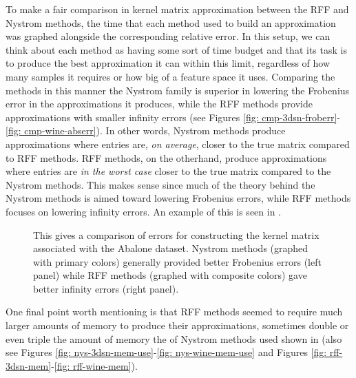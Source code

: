To make a fair comparison in kernel matrix approximation between the RFF and Nystrom methods, the time that each method used to build an approximation was graphed alongside the corresponding relative error. In this setup, we can think about each method as having some sort of time budget and that its task is to produce the best approximation it can within this limit, regardless of how many samples it requires or how big of a feature space it uses. Comparing the methods in this manner the Nystrom family is superior in lowering the Frobenius error in the approximations it produces, while the RFF methods provide approximations with smaller infinity errors (see Figures \ref{fig: cmp-3dsn-froberr}-\ref{fig: cmp-wine-abserr}). In other words, Nystrom methods produce approximations where entries are, {\it on average}, closer to the true matrix compared to RFF methods. RFF methods, on the otherhand, produce approximations where entries are {\it in the worst case} closer to the true matrix compared to the Nystrom methods. This makes sense since much of the theory behind the Nystrom methods is aimed toward lowering Frobenius errors, while RFF methods focuses on lowering infinity errors. An example of this is seen in .

\begin{figure}[H]
    \centering
    \caption{This gives a comparison of errors for constructing the kernel matrix associated with the Abalone dataset. Nystrom methods (graphed with primary colors) generally provided better Frobenius errors (left panel) while RFF methods (graphed with composite colors) gave better infinity errors (right panel).}
    \label{fig: nys-err-vs-rff-err}
\end{figure}

One final point worth mentioning is that RFF methods seemed to require much larger amounts of memory to produce their approximations, sometimes double or even triple the amount of memory the of Nystrom methods used shown in  (also see Figures \ref{fig: nys-3dsn-mem-use}-\ref{fig: nys-wine-mem-use} and Figures \ref{fig: rff-3dsn-mem}-\ref{fig: rff-wine-mem}).

